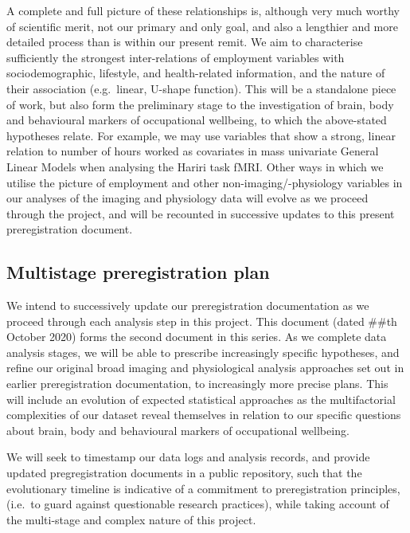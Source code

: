 \documentclass[
  english,
  man, donotrepeattitle]{apa6}
\begin{document}
A complete and full picture of these relationships is, although very much worthy of scientific merit, not our primary and only goal, and also a lengthier and more detailed process than is within our present remit. We aim to characterise sufficiently the strongest inter-relations of employment variables with sociodemographic, lifestyle, and health-related information, and the nature of their association (e.g.~linear, U-shape function). This will be a standalone piece of work, but also form the preliminary stage to the investigation of brain, body and behavioural markers of occupational wellbeing, to which the above-stated hypotheses relate. For example, we may use variables that show a strong, linear relation to number of hours worked as covariates in mass univariate General Linear Models when analysing the Hariri task fMRI. Other ways in which we utilise the picture of employment and other non-imaging/-physiology variables in our analyses of the imaging and physiology data will evolve as we proceed through the project, and will be recounted in successive updates to this present preregistration document.

\newpage

\hypertarget{multistage-preregistration-plan}{%
\subsection{Multistage preregistration plan}\label{multistage-preregistration-plan}}

We intend to successively update our preregistration documentation as we proceed through each analysis step in this project. This document (dated \#\#th October 2020) forms the second document in this series. As we complete data analysis stages, we will be able to prescribe increasingly specific hypotheses, and refine our original broad imaging and physiological analysis approaches set out in earlier preregistration documentation, to increasingly more precise plans. This will include an evolution of expected statistical approaches as the multifactorial complexities of our dataset reveal themselves in relation to our specific questions about brain, body and behavioural markers of occupational wellbeing.

We will seek to timestamp our data logs and analysis records, and provide updated pregregistration documents in a public repository, such that the evolutionary timeline is indicative of a commitment to preregistration principles, (i.e.~to guard against questionable research practices), while taking account of the multi-stage and complex nature of this project.
\end{document}
